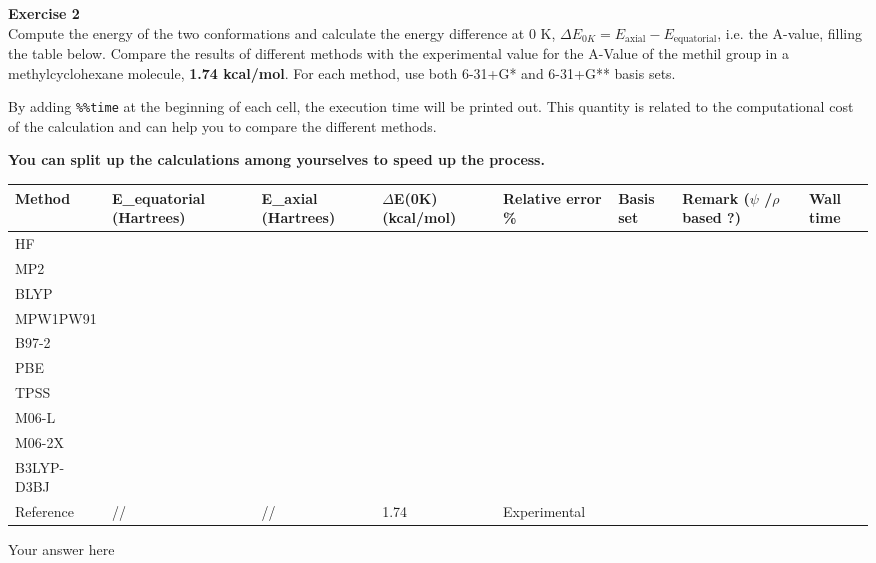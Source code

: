 \documentclass{article}
\begin{document}
\begin{mdframed}
\textbf{Exercise 2}\\
Compute the energy of the two conformations and calculate the energy difference at 0 K, $\Delta E_{0K} = E_{\text{axial}} - E_{\text{equatorial}}$, i.e. the A-value, filling the table below. Compare the results of different methods with the experimental value for the  A-Value of the methil group in a methylcyclohexane molecule, \textbf{1.74 kcal/mol}. For each method, use both 6-31+G* and 6-31+G** basis sets.

By adding \texttt{\%\%time} at the beginning of each cell, the execution time will be printed out. This quantity is related to the computational cost of the calculation and can help you to compare the different methods.

\textbf{You can split up the calculations among yourselves to speed up the process.}

\bigskip\noindent
\begin{tabular}{p{}p{}p{}p{}p{}p{}p{}p{}}
\toprule
Method & E\_equatorial (Hartrees) & E\_axial (Hartrees) & $\Delta$E(0K) (kcal/mol) & Relative error \% & Basis set & Remark ($\psi$ /$\rho$ based ?) & Wall time \\
\hline
HF &  &  &  &  &  &  &  \\
MP2 &  &  &  &  &  &  &  \\
BLYP &  &  &  &  &  &  &  \\
MPW1PW91 &  &  &  &  &  &  &  \\
B97-2 &  &  &  &  &  &  &  \\
PBE &  &  &  &  &  &  &  \\
TPSS &  &  &  &  &  &  &  \\
M06-L &  &  &  &  &  &  &  \\
M06-2X &  &  &  &  &  &  &  \\
B3LYP-D3BJ &  &  &  &  &  &  &  \\
Reference & // & // & 1.74 & Experimental &  &  &  \\
\bottomrule
\end{tabular}

\bigskip
\end{mdframed}

Your answer here
\end{document}
